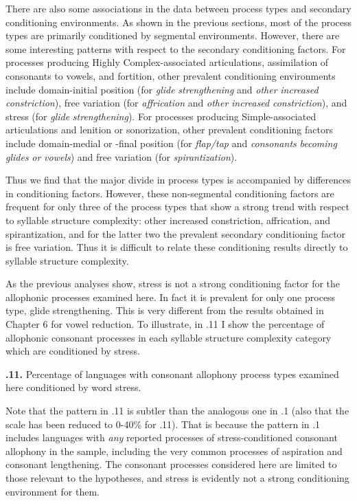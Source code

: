   There are also some associations in the data between process types and secondary conditioning environments. As shown in the previous sections, most of the process types are primarily conditioned by segmental environments. However, there are some interesting patterns with respect to the secondary conditioning factors. For processes producing Highly Complex-associated articulations, assimilation of consonants to vowels, and fortition, other prevalent conditioning environments include domain-initial position (for \textit{glide} \textit{strengthening} and \textit{other} \textit{increased} \textit{constriction}), free variation (for \textit{affrication} and \textit{other} \textit{increased} \textit{constriction}), and stress (for \textit{glide} \textit{strengthening}). For processes producing Simple-associated articulations and lenition or sonorization, other prevalent conditioning factors include domain-medial or -final position (for \textit{flap/tap} and \textit{consonants} \textit{becoming} \textit{glides} \textit{or} \textit{vowels}) and free variation (for \textit{spirantization}). 

  Thus we find that the major divide in process types is accompanied by differences in conditioning factors. However, these non-segmental conditioning factors are frequent for only three of the process types that show a strong trend with respect to syllable structure complexity: other increased constriction, affrication, and spirantization, and for the latter two the prevalent secondary conditioning factor is free variation. Thus it is difficult to relate these conditioning results directly to syllable structure complexity.

  As the previous analyses show, stress is not a strong conditioning factor for the allophonic processes examined here. In fact it is prevalent for only one process type, glide strengthening. This is very different from the results obtained in Chapter 6 for vowel reduction. To illustrate, in .11 I show the percentage of allophonic consonant processes in each syllable structure complexity category which are conditioned by stress.

\textbf{.11.} Percentage of languages with consonant allophony process types examined here conditioned by word stress.

  Note that the pattern in .11 is subtler than the analogous one in .1 (also that the scale has been reduced to 0-40\% for .11). That is because the pattern in .1 includes languages with \textit{any} reported processes of stress-conditioned consonant allophony in the sample, including the very common processes of aspiration and consonant lengthening. The consonant processes considered here are limited to those relevant to the hypotheses, and stress is evidently not a strong conditioning environment for them.

